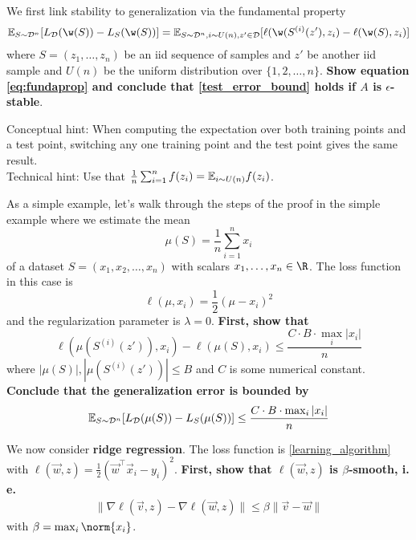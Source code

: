 \documentclass[preview]{standalone}
\begin{document}
\begin{Parts}
\item We first link stability to generalization via the fundamental property
  \begin{equation}
    \label{eq:fundaprop}
\E_{S\sim \DD^n} [L_\DD(\w(S)) - L_S(\w(S))] =
\E_{S \sim \DD^{n}, i\sim U(n), z'\in \DD} [\ell(\w(S^{(i)}(z'), z_i) - \ell(\w(S), z_i)]
\end{equation}
where $S = (z_1, \dots, z_n)$ be an iid sequence of samples and $z'$ be another
iid sample and $U(n)$ be the uniform distribution over $\{1, 2, \dots, n\}$. \textbf{Show equation \eqref{eq:fundaprop} and conclude that \eqref{test_error_bound} holds if $A$ is $\epsilon$-stable}.

Conceptual hint: When computing the expectation over both training points and a test point, switching any one training point and the test point gives the same result.\\

Technical hint: Use that $\frac{1}{n}\sum_{i=1}^n f(z_i) = \mathbb{E}_{i\sim U(n)} f(z_i)$.



\item As a simple example, let's walk through the steps of the proof in the simple example where
  we estimate the mean
  \begin{equation}
    \mu(S) = \frac 1 n \sum_{i=1}^n x_i
  \end{equation}
  of a dataset $S = (x_1, x_2, \dots, x_n)$ with scalars $x_1, \dots, x_n\in \R$.
  The loss function in this case is
  \begin{equation*}
    \ell(\mu, x_i) = \frac 1 2 (\mu - x_i)^2
  \end{equation*}
  and the regularization parameter is $\lambda = 0$.
  \textbf{First, show that}
  \begin{equation*}
    \ell(\mu(S^{(i)}(z')), x_i) - \ell(\mu(S), x_i) \leq \frac{C \cdot B\cdot \max_i |x_i|}{n}
  \end{equation*}
  where $|\mu(S)|, |\mu(S^{(i)}(z'))| \leq B$ and $C$ is some numerical constant.
  \textbf{Conclude that the generalization error is bounded by}
  \begin{equation*}
    \mathbb{E}_{S\sim \mathcal{D}^n} [L_{\mathcal{D}}(\mu(S)) - L_S(\mu(S))] \leq
    \frac{C \cdot B\cdot \max_i |x_i|}{n}
  \end{equation*}

\item We now consider {\bf ridge regression}. The loss function is \eqref{learning_algorithm}
with $\ell(\vec w, z) = \frac 1 2 (\vec w^\top \vec x_i - y_i)^2$. \textbf{First, show that $\ell(\vec w, z)$ is $\beta$-smooth, i. e.}
\begin{align*}
  \lVert \nabla \ell(\vec v, z) - \nabla \ell(\vec w, z)\lVert \leq
  \beta \lVert \vec v - \vec w\rVert
\end{align*}
with $\beta = \max_i \norm{x_i}$.


\end{Parts}
\end{document}
